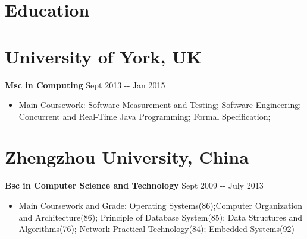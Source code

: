 \documentclass[margin]{res}
\begin{document}
  
\address{{\bf Present Address} \\ 37, Broadway west \\ 
York\\ YO10 4JN}
\address{{\bf Email Address} \\ fanlu91@gmail.com \\ {\bf Phone Number} \\
(044)7706 234389
}
\begin{resume} 
\section{Education} 
\section{University of York, UK} 
{\bf Msc in Computing} \hfill Sept
2013 -­‐ Jan 2015  \\
\begin{itemize}
  \item Main Coursework: Software
  Measurement and Testing; Software Engineering; Concurrent and Real-Time Java
  Programming; Formal Specification;
\end{itemize}
\section{Zhengzhou University, China}  
{\bf Bsc in Computer Science and Technology } \hfill Sept 2009 -­‐ July 2013\\
\begin{itemize}
\item Main Coursework and Grade: Operating Systems(86);Computer
Organization and Architecture(86); Principle of Database System(85); Data
Structures and Algorithms(76); Network Practical Technology(84); Embedded
Systems(92)
\end{itemize}

\end{resume}
\end{document}
